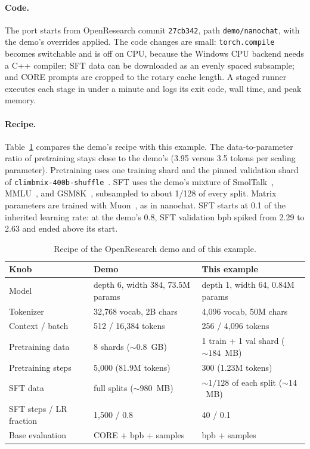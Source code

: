 \documentclass[11pt]{article}
\begin{document}
\paragraph{Code.} The port starts from OpenResearch commit \texttt{27cb342},
path \texttt{demo/nanochat}, with the demo's overrides applied. The code
changes are small: \texttt{torch.compile} becomes switchable and is off on CPU,
because the Windows CPU backend needs a C++ compiler; SFT data can be
downloaded as an evenly spaced subsample; and CORE prompts are cropped to the
rotary cache length. A staged runner executes each stage in under a minute
and logs its exit code, wall time, and peak memory.

\paragraph{Recipe.} Table~\ref{tab:recipe} compares the demo's recipe with
this example. The data-to-parameter ratio of pretraining stays close to the
demo's (3.95 versus 3.5 tokens per scaling parameter). Pretraining uses one
training shard and the pinned validation shard of
\texttt{climbmix-400b-shuffle}~\cite{karpathy2026climbmix}. SFT uses the
demo's mixture of SmolTalk~\cite{allal2025smollm2}, MMLU~\cite{hendrycks2021mmlu},
and GSM8K~\cite{cobbe2021gsm8k}, subsampled to about 1/128 of every split.
Matrix parameters are trained with Muon~\cite{jordan2024muon}, as in nanochat.
SFT starts at 0.1 of the inherited learning rate: at the demo's 0.8, SFT
validation bpb spiked from 2.29 to 2.63 and ended above its start.

\begin{table}[t]
\centering
\small
\begin{tabular}{lll}
\toprule
Knob & Demo & This example \\
\midrule
Model & depth 6, width 384, 73.5M params & depth 1, width 64, 0.84M params \\
Tokenizer & 32{,}768 vocab, 2B chars & 4{,}096 vocab, 50M chars \\
Context / batch & 512 / 16{,}384 tokens & 256 / 4{,}096 tokens \\
Pretraining data & 8 shards (${\sim}0.8$~GB) & 1 train + 1 val shard (${\sim}184$~MB) \\
Pretraining steps & 5{,}000 (81.9M tokens) & 300 (1.23M tokens) \\
SFT data & full splits (${\sim}980$~MB) & ${\sim}1/128$ of each split (${\sim}14$~MB) \\
SFT steps / LR fraction & 1{,}500 / 0.8 & 40 / 0.1 \\
Base evaluation & CORE + bpb + samples & bpb + samples \\
\bottomrule
\end{tabular}
\caption{Recipe of the OpenResearch demo and of this example.}
\label{tab:recipe}
\end{table}
\end{document}
